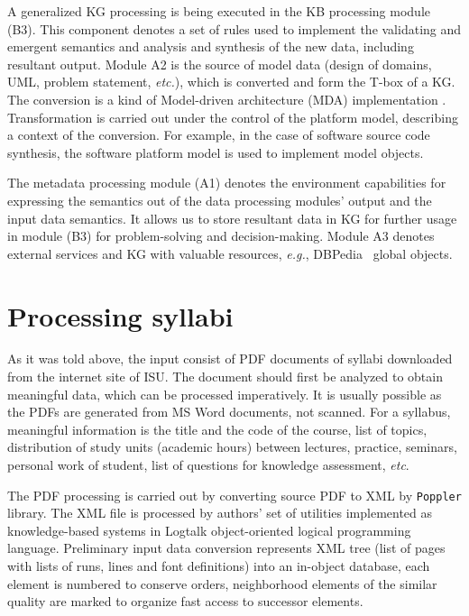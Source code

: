 \documentclass[
]{aiitart}
\begin{document}
A generalized KG processing is being executed in the KB processing module (B3).  This component denotes a set of rules used to implement the validating and emergent semantics and analysis and synthesis of the new data, including resultant output.  Module A2 is the source of model data (design of domains, UML, problem statement, \emph{etc.}), which is converted and form the T-box of a KG.  The conversion is a kind of Model-driven architecture (MDA) implementation \cite{b2}.  Transformation is carried out under the control of the platform model, describing a context of the conversion.  For example, in the case of software source code synthesis, the software platform model is used to implement model objects.

The metadata processing module (A1) denotes the environment capabilities for expressing the semantics out of the data processing modules' output and the input data semantics.  It allows us to store resultant data in KG for further usage in module (B3) for problem-solving and decision-making.  Module A3 denotes external services and KG with valuable resources, \emph{e.g.}, DBPedia~\cite{b3} global objects.

\section{Processing syllabi}

As it was told above, the input consist of PDF documents of syllabi downloaded from the internet site of ISU.  The document should first be analyzed to obtain meaningful data, which can be processed imperatively.  It is usually possible as the PDFs are generated from MS Word documents, not scanned.  For a syllabus, meaningful information is the title and the code of the course, list of topics, distribution of study units (academic hours) between lectures, practice, seminars, personal work of student, list of questions for knowledge assessment, \emph{etc}.

The PDF processing is carried out by converting source PDF to XML by \verb|Poppler| library.  The XML file is processed by authors' set of utilities implemented as knowledge-based systems in Logtalk \cite{logtalk} object-oriented logical programming language.  Preliminary input data conversion represents XML tree (list of pages with lists of runs, lines and font definitions) into an in-object database, each element is numbered to conserve orders, neighborhood elements of the similar quality are marked to organize fast access to successor elements.
\end{document}
